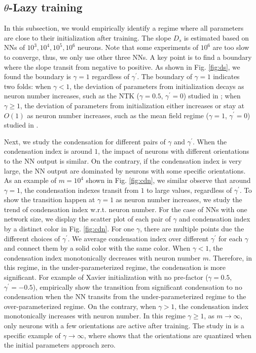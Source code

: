 \documentclass{article}
\begin{document}
\subsection{$\theta$-Lazy training}
In this subsection, we would empirically identify a regime where all parameters are close to their initialization after training. The slope $D_s$ is estimated based on NNs of $10^3,10^4,10^5,10^6$ neurons. Note that some experiments of $10^6$ are too slow to converge, thus, we only use other three NNs. A key point is to find a boundary where the slope transit from negative to positive. As shown in Fig. \ref{fig:ds}, we found the boundary is $\gamma=1$ regardless of $\gamma^{\prime}$.  The boundary of $\gamma=1$ indicates two folds: when $\gamma<1$, the deviation of parameters from initialization decays as neuron number increases, such as the NTK ($\gamma=0.5$, $\gamma^{\prime}=0$) studied in \cite{jacot_neural_2018}; when $\gamma\geq1$,  the deviation of parameters from initialization either increases or stay at $O(1)$ as neuron number increases, such as the mean field regime  ($\gamma=1$, $\gamma^{\prime}=0$) studied in \cite{mei_mean_2018}.

Next, we study the condensation for different pairs of $\gamma$ and $\gamma^{\prime}$.  When the condensation index is around $1$, the impact of neurons with different orientations to the NN output is similar. On the contrary, if the condensation index is very large, the NN output are dominated by neurons with some specific orientations.  As an example of $m=10^4$ shown in Fig. \ref{fig:cdn}, we similar observe that around $\gamma=1$, the condensation indexes transit from $1$ to large values, regardless of $\gamma^{\prime}$. To show the transition happen at $\gamma=1$ as neuron number increases, we study the trend of condensation index w.r.t. neuron number. For the case of NNs with one network size, we display the scatter plot of each pair of $\gamma$ and condensation index by a distinct color in Fig. \ref{fig:cdn}. For one $\gamma$, there are multiple points due the different choices of $\gamma^{\prime}$. We average condensation index over different $\gamma^{\prime}$ for each $\gamma$ and connect them by a solid color with the same color. When $\gamma<1$, the condensation index monotonically decreases with neuron number $m$. Therefore, in this regime, in the under-parameterized regime, the condensation is more significant. For example of Xavier initialization with no pre-factor ($\gamma=0.5$, $\gamma^{\prime}=-0.5$), \cite{ma2020quenching}  empirically show the transition from significant condensation to no condensation when the NN transits from the under-parameterized regime to the over-parameterized regime. On the contrary, when $\gamma>1$, the condensation index monotonically increases with neuron number. In this regime $\gamma\geq1$, as $m\rightarrow\infty$, only neurons with a few orientations are active after training. The study in \cite{maennel2018gradient} is a specific example of  $\gamma\rightarrow\infty$, where \cite{maennel2018gradient} shows that the orientations are quantized when the initial parameters approach zero.
\end{document}
